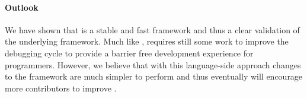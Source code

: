 \paragraph{\NB Outlook}
We have shown that \NB is a stable and fast \FFI framework and thus a clear validation of the underlying \B framework.
Much like \B, \NB requires still some work to improve the debugging cycle to provide a barrier free development experience for \PH programmers.
However, we believe that with this language-side approach changes to the \FFI framework are much simpler to perform and thus eventually will encourage more contributors to improve \NB.




